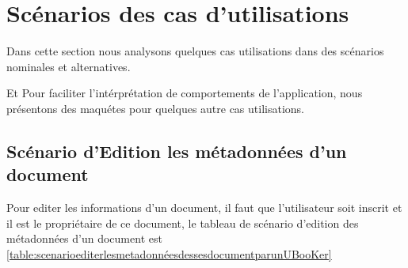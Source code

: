 \documentclass[12pt]{report}
\begin{document}
\section{Scénarios des cas d'utilisations}

Dans cette section nous analysons quelques cas utilisations dans des scénarios nominales et alternatives.

Et Pour faciliter l'intérprétation de comportements de l'application, nous présentons des maquétes pour quelques autre cas utilisations.

\subsection{Scénario d'Edition les métadonnées d'un document}

Pour editer les informations d'un document, il faut que l'utilisateur soit inscrit et il est le
propriétaire de ce document, le tableau de scénario d'edition des métadonnées d'un document est \ref{table:scenarioediterlesmetadonnéesdessesdocumentparunUBooKer}
\end{document}
